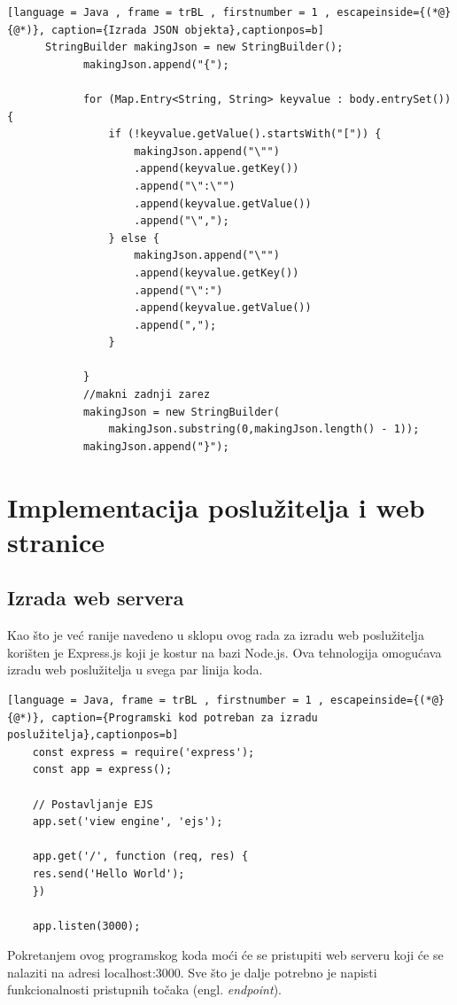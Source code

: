 \documentclass[times, utf8, zavrsni, numeric]{fer}
\begin{document}
	\renewcommand{\lstlistingname}{Kôd}
	\begin{lstlisting}[language = Java , frame = trBL , firstnumber = 1 , escapeinside={(*@}{@*)}, caption={Izrada JSON objekta},captionpos=b]
	  StringBuilder makingJson = new StringBuilder();
            makingJson.append("{");

            for (Map.Entry<String, String> keyvalue : body.entrySet()) {
                if (!keyvalue.getValue().startsWith("[")) {
                    makingJson.append("\"")
					.append(keyvalue.getKey())
					.append("\":\"")
					.append(keyvalue.getValue())
					.append("\",");
                } else {
                    makingJson.append("\"")
					.append(keyvalue.getKey())
					.append("\":")
					.append(keyvalue.getValue())
					.append(",");
                }

            }
            //makni zadnji zarez
            makingJson = new StringBuilder(
				makingJson.substring(0,makingJson.length() - 1));
            makingJson.append("}");
	\end{lstlisting}
	
	
\chapter{Implementacija poslužitelja i web stranice}
	\section{Izrada web servera}
	Kao što je već ranije navedeno u sklopu ovog rada za izradu web poslužitelja korišten je Express.js koji je kostur na bazi Node.js. Ova tehnologija omogućava izradu web poslužitelja u svega par linija koda.
	\renewcommand{\lstlistingname}{Kôd}
	\begin{lstlisting}[language = Java, frame = trBL , firstnumber = 1 , escapeinside={(*@}{@*)}, caption={Programski kod potreban za izradu poslužitelja},captionpos=b]
	const express = require('express');
	const app = express();
 
	// Postavljanje EJS
	app.set('view engine', 'ejs');
 
	app.get('/', function (req, res) {
    res.send('Hello World');
	})

	app.listen(3000);
	\end{lstlisting}
	
	Pokretanjem ovog programskog koda moći će se pristupiti web serveru koji će se nalaziti na adresi localhost:3000. Sve što je dalje potrebno je napisti funkcionalnosti pristupnih točaka (engl. \textit{endpoint}).
\end{document}
